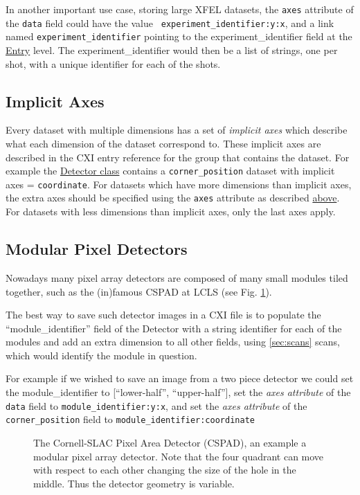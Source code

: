 \documentclass[usletter,11pt]{article}
\begin{document}
In another important use case, storing large XFEL datasets, the {\tt axes} 
attribute of the {\tt data} field could have the value {\tt
experiment\_identifier:y:x}, and a link named {\tt experiment\_identifier}
pointing to the experiment\_identifier field at the \hyperref[table:entry]{Entry} level.
The experiment\_identifier would then be a list of strings, one per shot, 
with a unique identifier for each of the shots.

\subsection{Implicit Axes}
\label{subsec:implaxes}

Every dataset with multiple dimensions has a set of {\em implicit axes} which
describe what each dimension of the dataset correspond to. These implicit axes
are described in the CXI entry reference for the group that contains the
dataset. For example the \hyperref[table:detector]{Detector class} contains a
{\tt corner\_position} dataset with implicit axes = {\tt coordinate}. For
datasets which have more dimensions than implicit axes, the extra axes should be
specified using the {\tt axes} attribute as described \hyperref[subsec:dimscales]{above}. For datasets with
less dimensions than implicit axes, only the last axes apply. 

\subsection{Modular Pixel Detectors}
\label{subsec:modularDetectors}

Nowadays many pixel array detectors are composed of many small modules tiled
together, such as the (in)famous CSPAD at LCLS (see Fig. \ref{fig:cspad}).

The best way to save such detector images in a CXI file is to populate the 
``module\_identifier'' field of the Detector with a string identifier for each of
the modules and add an extra dimension to all other fields, using
\ref{sec:scans} scans, which would identify the module in question. 

For example if we wished to save an image from a two piece detector we could set
the module\_identifier to [``lower-half'', ``upper-half''], set the {\em
  axes attribute} of the {\tt data} field to {\tt module\_identifier:y:x},
and set the  {\em axes attribute} of the {\tt corner\_position} field to
{\tt module\_identifier:coordinate}

\begin{figure}[h!]
\centering
\caption{The Cornell-SLAC Pixel Area Detector (CSPAD), an example a modular
  pixel array detector. Note that the four quadrant can move with respect to
  each other changing the size of the hole in the middle. Thus the detector
  geometry is variable.}
\label{fig:cspad}
\end{figure}
\end{document}
